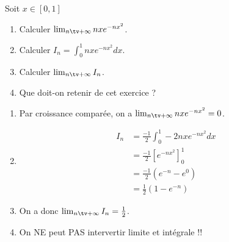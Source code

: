 


\begin{exercice}
Soit $x\in [0,1]$ 

\begin{enumerate}
\item Calculer $\lim_{n\tv+\infty} nxe^{-nx^2}$.
\item Calculer $I_n=\int_0^1 nxe^{-nx^2}dx$.
\item Calculer $\lim_{n\tv+\infty} I_n$.
\item Que doit-on retenir de cet exercice ? 
\end{enumerate}
\end{exercice}


\begin{correction}
\begin{enumerate}
\item Par croissance comparée, on a $\lim_{n\tv+\infty} nxe^{-nx^2}=0$.
\item \begin{align*}
I_n&=\frac{-1}{2}\int_0^1 -2nxe^{-nx^2}dx\\
	&=\frac{-1}{2}[e^{-nx^2}]_0^1 \\
	&=\frac{-1}{2}(e^{-n} -e^{0}) \\
		&=\frac{1}{2}(1-e^{-n}) 
\end{align*}
\item On  a donc $\lim_{n\tv+\infty} I_n=\frac{1}{2}$. 
\item On NE peut PAS intervertir limite et intégrale !!
\end{enumerate}
\end{correction}